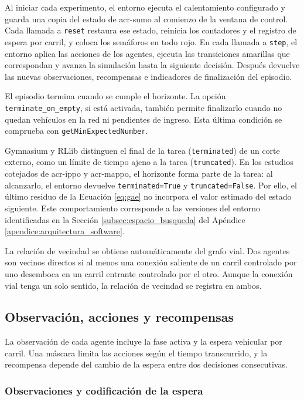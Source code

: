 Al iniciar cada experimento, el entorno ejecuta el calentamiento configurado y guarda una copia del estado de \acrshort{acr-sumo} al comienzo de la ventana de control. Cada llamada a \texttt{reset} restaura ese estado, reinicia los contadores y el registro de espera por carril, y coloca los semáforos en todo rojo. En cada llamada a \texttt{step}, el entorno aplica las acciones de los agentes, ejecuta las transiciones amarillas que correspondan y avanza la simulación hasta la siguiente decisión. Después devuelve las nuevas observaciones, recompensas e indicadores de finalización del episodio.

El episodio termina cuando se cumple el horizonte. La opción \texttt{terminate\_on\_}\allowbreak\texttt{empty}, si está activada, también permite finalizarlo cuando no quedan vehículos en la red ni pendientes de ingreso. Esta última condición se comprueba con \texttt{getMinExpectedNumber}.

Gymnasium y RLlib distinguen el final de la tarea (\texttt{terminated}) de un corte externo, como un límite de tiempo ajeno a la tarea (\texttt{truncated}). En los estudios cotejados de \acrshort{acr-ippo} y \acrshort{acr-mappo}, el horizonte forma parte de la tarea: al alcanzarlo, el entorno devuelve \texttt{terminated=True} y \texttt{truncated=False}. Por ello, el último residuo de la Ecuación \eqref{eq:gae} no incorpora el valor estimado del estado siguiente. Este comportamiento corresponde a las versiones del entorno identificadas en la Sección \ref{subsec:espacio_busqueda} del Apéndice \ref{apendice:arquitectura_software}.

La relación de vecindad se obtiene automáticamente del grafo vial. Dos agentes son vecinos directos si al menos una conexión saliente de un carril controlado por uno desemboca en un carril entrante controlado por el otro. Aunque la conexión vial tenga un solo sentido, la relación de vecindad se registra en ambos.

\subsection{Observación, acciones y recompensas}
\label{sec:formulacion_dec_pomdp}

La observación de cada agente incluye la fase activa y la espera vehicular por carril. Una máscara limita las acciones según el tiempo transcurrido, y la recompensa depende del cambio de la espera entre dos decisiones consecutivas.

\subsubsection{Observaciones y codificación de la espera}
\label{subsec:observaciones_encoder}

